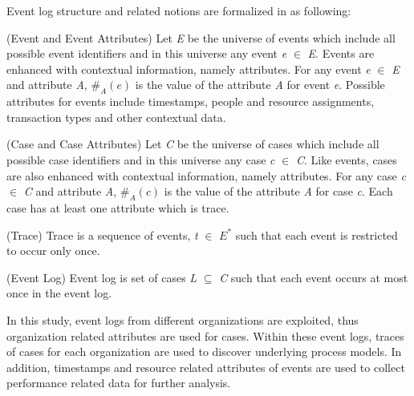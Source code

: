 Event log structure and related notions are formalized in \cite{van2011process} as following:
  \theoremstyle{definition}
  \begin{definition}{}
  (Event and Event Attributes) Let \textit{E} be the universe of events which include all possible event identifiers and in this universe any event \textit{e} $\in$ \textit{E}. Events are enhanced with contextual information, namely attributes. For any event \textit{e} $\in$ \textit{E} and attribute \textit{A}, $\#_\textit{A}(\textit{e})$ is the value of the attribute \textit{A} for event \textit{e}. Possible attributes for events include timestamps, people and resource assignments, transaction types and other contextual data.
  \end{definition}
  \theoremstyle{definition}
  \begin{definition}{}
  (Case and Case Attributes) Let \textit{C} be the universe of cases which include all possible case identifiers and in this universe any case \textit{c} $\in$ \textit{C}. Like events, cases are also enhanced with contextual information, namely attributes. For any case \textit{c} $\in$ \textit{C} and attribute \textit{A}, $\#_\textit{A}(\textit{c})$ is the value of the attribute \textit{A} for case \textit{c}. Each case has at least one attribute which is trace.
  \end{definition}
  \theoremstyle{definition}
  \begin{definition}{}
  (Trace) Trace is a sequence of events, \textit{t} $\in$ ${E}^{*}$ such that each event is restricted to occur only once.
  \end{definition}
  \theoremstyle{definition}
  \begin{definition}{}
  (Event Log) Event log is set of cases \textit{L} $\subseteq$ \textit{C} such that each event occurs at most once in the event log.
  \end{definition}

In this study, event logs from different organizations are exploited, thus organization related attributes are used for cases. Within these event logs, traces of cases for each organization are used to discover underlying process models. In addition, timestamps and resource related attributes of events are used to collect performance related data for further analysis.

